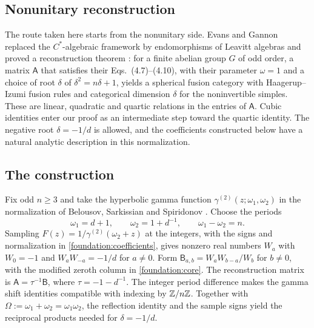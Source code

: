 \subsection*{Nonunitary reconstruction}

The route taken here starts from the nonunitary side. Evans and Gannon
replaced the $C^*$-algebraic framework by endomorphisms of Leavitt
algebras and proved a reconstruction theorem \cite[Theorem~2(a)]{EG}:
for a finite abelian group $G$ of odd order, a matrix $\mathsf A$
that satisfies their Eqs.~(4.7)--(4.10), with their parameter
$\omega=1$ and a choice of root $\delta$ of
$\delta^2=n\delta+1$, yields a spherical fusion category with
Haagerup--Izumi fusion rules and categorical dimension $\delta$ for the
noninvertible simples. These are linear, quadratic and quartic
relations in the entries of $\mathsf A$. Cubic identities enter our
proof as an intermediate step toward the quartic identity. The
negative root $\delta=-1/d$ is allowed, and the coefficients constructed
below have a natural analytic description in this normalization.

\subsection*{The construction}

Fix odd $n\ge3$ and take the hyperbolic gamma function
$\gamma^{(2)}(z;\omega_1,\omega_2)$ in the normalization of
Belousov, Sarkissian and Spiridonov \cite{BSS}. Choose the periods
\[
 \omega_1=d+1,\qquad \omega_2=1+d^{-1},\qquad \omega_1-\omega_2=n .
\]
Sampling $F(z)=1/\gamma^{(2)}(\omega_2+z)$ at the integers, with the
signs and normalization in \eqref{foundation:coefficients}, gives
nonzero real numbers $W_a$ with $W_0=-1$ and
$W_aW_{-a}=-1/d$ for $a\ne0$. Form
$\mathsf B_{a,b}=W_aW_{b-a}/W_b$ for $b\ne0$, with the modified zeroth
column in \eqref{foundation:core}. The reconstruction matrix is
$\mathsf A=\tau^{-1}\mathsf B$, where $\tau=-1-d^{-1}$.
The integer period difference makes the gamma shift identities
compatible with indexing by $\mathbb Z/n\mathbb Z$. Together with
$\Omega:=\omega_1+\omega_2=\omega_1\omega_2$, the reflection identity
and the sample signs yield the reciprocal products needed for
$\delta=-1/d$.

